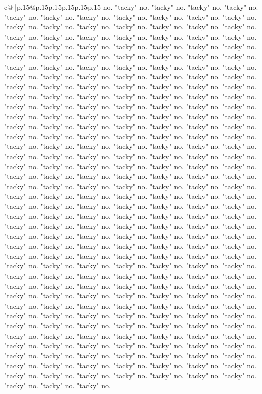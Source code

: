 \documentclass{article}
\begin{document}
{\begin{supertabular}{c@{$\;$}|p{.15\linewidth}@{}p{.15\linewidth}p{.15\linewidth}p{.15\linewidth}p{.15\linewidth}p{.15\linewidth}}
{{{no. "tacky" no. "tacky" no. "tacky" no. "tacky" no. "tacky" no. "tacky" no. "tacky" no. "tacky" no. "tacky" no. "tacky" no. "tacky" no. "tacky" no. "tacky" no. "tacky" no. "tacky" no. "tacky" no. "tacky" no. "tacky" no. "tacky" no. "tacky" no. "tacky" no. "tacky" no. "tacky" no. "tacky" no. "tacky" no. "tacky" no. "tacky" no. "tacky" no. "tacky" no. "tacky" no. "tacky" no. "tacky" no. "tacky" no. "tacky" no. "tacky" no. "tacky" no. "tacky" no. "tacky" no. "tacky" no. "tacky" no. "tacky" no. "tacky" no. "tacky" no. "tacky" no. "tacky" no. "tacky" no. "tacky" no. "tacky" no. "tacky" no. "tacky" no. "tacky" no. "tacky" no. "tacky" no. "tacky" no. "tacky" no. "tacky" no. "tacky" no. "tacky" no. "tacky" no. "tacky" no. "tacky" no. "tacky" no. "tacky" no. "tacky" no. "tacky" no. "tacky" no. "tacky" no. "tacky" no. "tacky" no. "tacky" no. "tacky" no. "tacky" no. "tacky" no. "tacky" no. "tacky" no. "tacky" no. "tacky" no. "tacky" no. "tacky" no. "tacky" no. "tacky" no. "tacky" no. "tacky" no. "tacky" no. "tacky" no. "tacky" no. "tacky" no. "tacky" no. "tacky" no. "tacky" no. "tacky" no. "tacky" no. "tacky" no. "tacky" no. "tacky" no. "tacky" no. "tacky" no. "tacky" no. "tacky" no. "tacky" no. "tacky" no. "tacky" no. "tacky" no. "tacky" no. "tacky" no. "tacky" no. "tacky" no. "tacky" no. "tacky" no. "tacky" no. "tacky" no. "tacky" no. "tacky" no. "tacky" no. "tacky" no. "tacky" no. "tacky" no. "tacky" no. "tacky" no. "tacky" no. "tacky" no. "tacky" no. "tacky" no. "tacky" no. "tacky" no. "tacky" no. "tacky" no. "tacky" no. "tacky" no. "tacky" no. "tacky" no. "tacky" no. "tacky" no. "tacky" no. "tacky" no. "tacky" no. "tacky" no. "tacky" no. "tacky" no. "tacky" no. "tacky" no. "tacky" no. "tacky" no. "tacky" no. "tacky" no. "tacky" no. "tacky" no. "tacky" no. "tacky" no. "tacky" no. "tacky" no. "tacky" no. "tacky" no. "tacky" no. "tacky" no. "tacky" no. "tacky" no. "tacky" no. "tacky" no. "tacky" no. "tacky" no. "tacky" no. "tacky" no. "tacky" no. "tacky" no. "tacky" no. "tacky" no. "tacky" no. "tacky" no. "tacky" no. "tacky" no. "tacky" no. "tacky" no. "tacky" no. "tacky" no. "tacky" no. "tacky" no. "tacky" no. "tacky" no. "tacky" no. "tacky" no. "tacky" no. "tacky" no. "tacky" no. "tacky" no. "tacky" no. "tacky" no. "tacky" no. "tacky" no. "tacky" no. "tacky" no. "tacky" no. "tacky" no. "tacky" no. "tacky" no. "tacky" no. "tacky" no. "tacky" no. "tacky" no. "tacky" no. "tacky" no. "tacky" no. "tacky" no. "tacky" no. "tacky" no. "tacky" no. "tacky" no. "tacky" no. "tacky" no. "tacky" no. "tacky" no. "tacky" no. "tacky" no. "tacky" no. "tacky" no. "tacky" no. "tacky" no. "tacky" no. "tacky" no. "tacky" no. "tacky" no. "tacky" no. "tacky" no. "tacky" no. "tacky" no. "tacky" no. "tacky" no. "tacky" no. "tacky" no. "tacky" no. "tacky" no. "tacky" no. "tacky" no. "tacky" no. "tacky" no. "tacky" no. "tacky" no. "tacky" no. "tacky" no. "tacky" no. "tacky" no. "tacky" no. "tacky" no. "tacky" no. "tacky" no. "tacky" no. "tacky" no. "tacky" no. "tacky" no. "tacky" no. "tacky" no. "tacky" no. "tacky" no. "tacky" no. "tacky" no. "tacky" no. "tacky" no. "tacky" no. "tacky" no. "tacky" no. "tacky" no. "tacky" no. "tacky" no. "tacky" no. "tacky" no. "tacky" no. }}}
\end{supertabular}}
\end{document}
